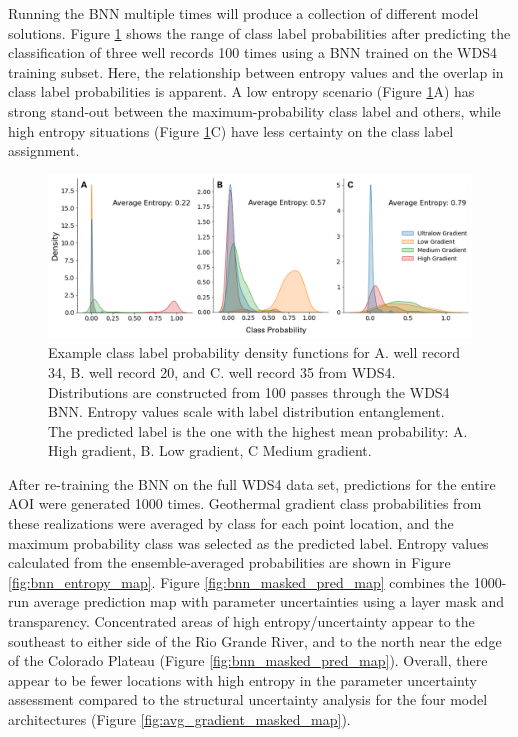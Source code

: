 Running the BNN multiple times will produce a collection of different model solutions. Figure \ref{fig:bnn_class_pdfs} shows the range of class label probabilities after predicting the classification of three well records 100 times using a BNN trained on the WDS4 training subset. Here, the relationship between entropy values and the overlap in class label probabilities is apparent. A low entropy scenario (Figure \ref{fig:bnn_class_pdfs}A) has strong stand-out between the maximum-probability class label and others, while high entropy situations (Figure \ref{fig:bnn_class_pdfs}C) have less certainty on the class label assignment.

\begin{figure}%
\centering
\includegraphics[width=\textwidth]{templates/images/Figure-BNN_100trials_WDS4.png}
\caption[Bayesian neural network class pdfs]{Example class label probability density functions for A. well record 34, B. well record 20, and C. well record 35 from WDS4. Distributions are constructed from 100 passes through the WDS4 BNN. Entropy values scale with label distribution entanglement. The predicted label is the one with the highest mean probability: A. High gradient, B. Low gradient, C Medium gradient.}
\label{fig:bnn_class_pdfs}
\end{figure}

After re-training the BNN on the full WDS4 data set, predictions for the entire AOI were generated 1000 times. Geothermal gradient class probabilities from these realizations were averaged by class for each point location, and the maximum probability class was selected as the predicted label. Entropy values calculated from the ensemble-averaged probabilities are shown in Figure \ref{fig:bnn_entropy_map}. Figure \ref{fig:bnn_masked_pred_map} combines the 1000-run average prediction map with parameter uncertainties using a layer mask and transparency. Concentrated areas of high entropy/uncertainty appear to the southeast to either side of the Rio Grande River, and to the north near the edge of the Colorado Plateau (Figure \ref{fig:bnn_masked_pred_map}). Overall, there appear to be fewer locations with high entropy in the parameter uncertainty assessment compared to the structural uncertainty analysis for the four model architectures (Figure \ref{fig:avg_gradient_masked_map}).


